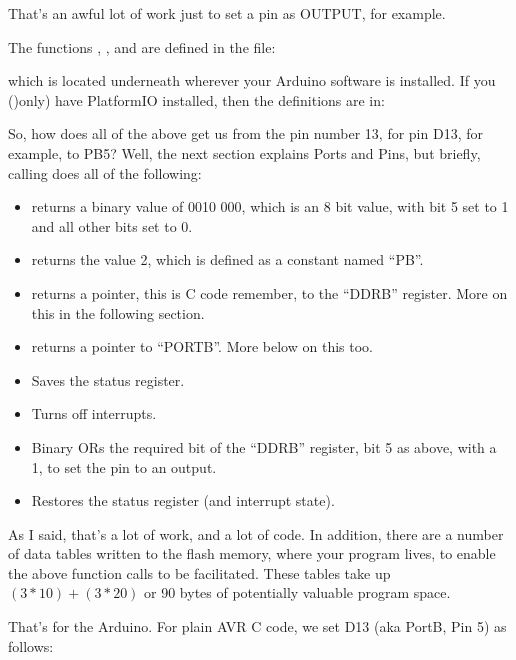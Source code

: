 That's an awful lot of work just to set a pin as OUTPUT, for example.

The functions , ,  and  are defined in the file:


which is located underneath wherever your Arduino software is installed. If you ()only) have PlatformIO installed, then the definitions are in:


So, how does all of the above get us from the pin number 13, for pin D13, for example, to PB5? Well, the next section explains Ports and Pins, but briefly, calling  does all of the following:

\begin{itemize}
	\item {} returns a binary value of 0010 000, which is an 8 bit value, with bit 5 set to 1 and all other bits set to 0.
	\item {} returns the value 2, which is defined as a constant named ``PB''.
	\item {} returns a pointer, this is C code remember, to the ``DDRB'' register. More on this in the following section.
	\item {} returns a pointer to ``PORTB''. More below on this too.
	\item Saves the status register.
	\item Turns off interrupts.
	\item Binary ORs the required bit of the ``DDRB'' register, bit 5 as above, with a 1, to set the pin to an output.
	\item Restores the status register (and interrupt state).
\end{itemize}

As I said, that's a lot of work, and a lot of code. In addition, there are a number of data tables written to the flash memory, where your program lives, to enable the above function calls to be facilitated. These tables take up $(3 * 10) + (3 * 20)$ or 90 bytes of potentially valuable program space.

That's for the Arduino. For plain AVR C code, we set D13 (aka PortB, Pin 5) as follows:

